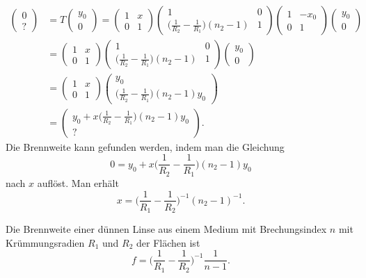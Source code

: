 \begin{align*}
\begin{pmatrix}
0\\?
\end{pmatrix}
&=
T
\begin{pmatrix}y_0\\0\end{pmatrix}
=
\begin{pmatrix}
1&x\\
0&1
\end{pmatrix}
\begin{pmatrix}
1&0\\
\displaystyle
\biggl(\frac1{R_2}-\frac1{R_1}\biggr)(n_2-1)
&1
\end{pmatrix}
\begin{pmatrix}
1&-x_0\\
0&1
\end{pmatrix}
\begin{pmatrix}y_0\\0\end{pmatrix}
\\
&=
\begin{pmatrix}
1&x\\
0&1
\end{pmatrix}
\begin{pmatrix}
1&0\\
\displaystyle
\biggl(\frac1{R_2}-\frac1{R_1}\biggr)(n_2-1)
&1
\end{pmatrix}
\begin{pmatrix}y_0\\0\end{pmatrix}
\\
&=
\begin{pmatrix}
1&x\\
0&1
\end{pmatrix}
\begin{pmatrix}y_0
\\
\displaystyle\biggl(\frac1{R_2}-\frac1{R_1}\biggr)(n_2-1)y_0
\end{pmatrix}
\\
&=
\begin{pmatrix}
y_0 + \displaystyle x\biggl(\frac1{R_2}-\frac1{R_1}\biggr)(n_2-1)y_0
\\
?
\end{pmatrix}.
\end{align*}
Die Brennweite kann gefunden werden, indem man die Gleichung
\[
0=
y_0 + \displaystyle x\biggl(\frac1{R_2}-\frac1{R_1}\biggr)(n_2-1)y_0
\]
nach $x$ auflöst.
Man erhält
\[
x
=
\biggl(
\frac{1}{R_1}-\frac{1}{R_2}
\biggr)^{-1}
(n_2-1)^{-1}.
\]
\begin{satz}
Die Brennweite einer dünnen Linse aus einem Medium mit Brechungsindex $n$ 
mit Krümmungsradien $R_1$ und $R_2$ der Flächen ist
\[
f = \biggl(\frac{1}{R_1}-\frac{1}{R_2}\biggr)^{-1} \frac{1}{n-1}.
\]
\end{satz}

